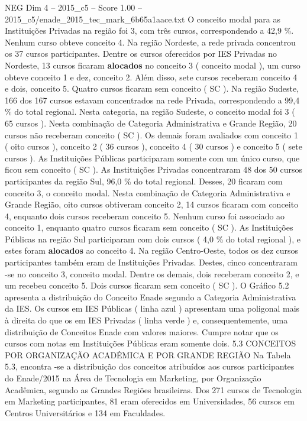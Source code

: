 \begin{textsample}{NEG Dim 4 – 2015\_c5 – Score 1.00 – 2015\_c5/enade\_2015\_tec\_mark\_6b65a1aace.txt}
O conceito modal para as Instituições Privadas na região foi 3, com três cursos, correspondendo a 42,9 \%.
Nenhum curso obteve conceito 4.
Na região Nordeste, a rede privada concentrou os 37 cursos participantes.
Dentre os cursos oferecidos por IES Privadas no Nordeste, 13 cursos ficaram \textbf{alocados} no conceito 3 ( conceito modal ), um curso obteve conceito 1 e dez, conceito 2.
Além disso, sete cursos receberam conceito 4 e dois, conceito 5.
Quatro cursos ficaram sem conceito ( SC ).
Na região Sudeste, 166 dos 167 cursos estavam concentrados na rede Privada, correspondendo a 99,4 \% do total regional.
Nesta categoria, na região Sudeste, o conceito modal foi 3 ( 65 cursos ).
Nesta combinação de Categoria Administrativa e Grande Região, 20 cursos não receberam conceito ( SC ).
Os demais foram avaliados com conceito 1 ( oito cursos ), conceito 2 ( 36 cursos ), conceito 4 ( 30 cursos ) e conceito 5 ( sete cursos ).
As Instituições Públicas participaram somente com um único curso, que ficou sem conceito ( SC ).
As Instituições Privadas concentraram 48 dos 50 cursos participantes da região Sul, 96,0 \% do total regional.
Desses, 20 ficaram com conceito 3, o conceito modal.
Nesta combinação de Categoria Administrativa e Grande Região, oito cursos obtiveram conceito 2, 14 cursos ficaram com conceito 4, enquanto dois cursos receberam conceito 5.
Nenhum curso foi associado ao conceito 1, enquanto quatro cursos ficaram sem conceito ( SC ).
As Instituições Públicas na região Sul participaram com dois cursos ( 4,0 \% do total regional ), e estes foram \textbf{alocados} ao conceito 4.
Na região Centro-Oeste, todos os dez cursos participantes também eram de Instituições Privadas.
Destes, cinco concentraram -se no conceito 3, conceito modal.
Dentre os demais, dois receberam conceito 2, e um recebeu conceito 5.
Dois cursos ficaram sem conceito ( SC ).
O Gráfico 5.2 apresenta a distribuição do Conceito Enade segundo a Categoria Administrativa da IES.
Os cursos em IES Públicas ( linha azul ) apresentam uma poligonal mais à direita do que os em IES Privadas ( linha verde ) e, consequentemente, uma distribuição de Conceitos Enade com valores maiores.
Cumpre notar que os cursos com notas em Instituições Públicas eram somente dois. 5.3 CONCEITOS POR ORGANIZAÇÃO ACADÊMICA E POR GRANDE REGIÃO Na Tabela 5.3, encontra -se a distribuição dos conceitos atribuídos aos cursos participantes do Enade/2015 na Área de Tecnologia em Marketing, por Organização Acadêmica, segundo as Grandes Regiões brasileiras.
Dos 271 cursos de Tecnologia em Marketing participantes, 81 eram oferecidos em Universidades, 56 cursos em Centros Universitários e 134 em Faculdades.

\end{textsample}
